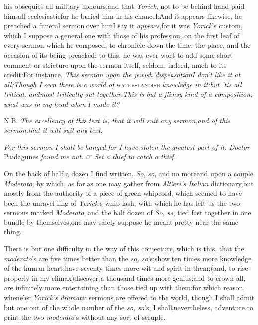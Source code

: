 \documentclass{article}
\begin{document}
\newpage
\noindent{}
his obsequies all
military honours,\tsk and that \textit{Yorick}, not to be
behind-hand\tsk\break
paid him all ecclesiastic\tsk for he buried him
in his chancel:\tsk And it appears likewise, he preached a
funeral sermon over him\tsh I say it
\textit{appears},\tsk for it was \textit{Yorick}’s custom,
which I suppose a general one with those of his profession, on the
first leaf of every sermon which he composed, to chronicle down the
time, the place, and the occasion of its being preached: to this,
he was ever wont to add some short comment or stricture upon the
sermon itself, seldom, indeed, much to its credit:\tsk For
instance, \textit{This sermon upon the jewish dispensation\tsk I
don’t like it at all;\tsk Though I own there is a world
of} \textsc{water-landish} \textit{knowledge in it;\tsk but
’tis all tritical, and\pb most tritically put
together.\tsk This is but a flimsy kind of a composition; what
was in my head when I made it?}

\tsh N.B. \textit{The excellency of this text is, that it
will suit any sermon,\tsk and of this sermon,\tsh that
it will suit any text.\tsh}

\tsh \textit{For this sermon I shall be
hanged,\break\tsk for I have stolen the greatest part of it. Doctor}
Paidagunes \textit{found me out. ☞  Set a thief to catch a
thief.\tsh}

On the back of half a dozen I find written, \textit{So}, \textit{so}, and no
more\tsh and upon a couple \textit{Moderato}; by which, as
far as one may gather from \textit{Altieri’s Italian}
dictionary,\tsk but mostly from the authority of a piece of green
whipcord, which seemed to have been the unravel-\pb ling of
\textit{Yorick}’s whip-lash, with which he has left us the two
sermons marked \textit{Moderato}, and the half dozen of \textit{So,
so}, tied fast together in one bundle by themselves,\tsk one
may safely suppose he meant pretty near the same thing.

There is but one difficulty in the way of this conjecture, which
is this, that the \textit{moderato}’s are five times better
than the \textit{so, so}’s;\tsk show ten times more knowledge
of the human heart;\tsk have seventy times more wit and spirit in
them;\tsk (and, to rise properly in my climax)\tsk discover a
thousand times more genius;\break\tsk and to crown all, are infinitely
more entertaining than those tied up with them:\tsk for
which reason, whene’er \textit{Yorick’s dramatic} sermons
are offered to the world, though I shall admit but one out of the
whole number of the \textit{so, so}’s, I shall,\pb nevertheless,
adventure to print the two \textit{moderato}’s without any sort
of scruple.
\end{document}
